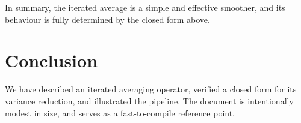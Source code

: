 \documentclass[11pt,a4paper]{article}
\begin{document}
In summary, the iterated average is a simple and effective smoother, and its
behaviour is fully determined by the closed form above.

\section{Conclusion}

We have described an iterated averaging operator, verified a closed form for its
variance reduction, and illustrated the pipeline. The document is intentionally
modest in size, and serves as a fast-to-compile reference point.
\end{document}
